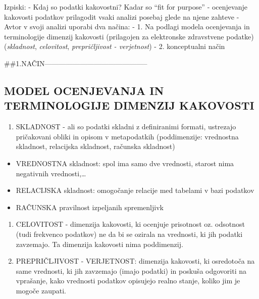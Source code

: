 \documentclass[
]{article}
\providecommand{\tightlist}{%
  \setlength{\itemsep}{0pt}\setlength{\parskip}{0pt}}
\begin{document}
Izpiski: - Kdaj so podatki kakovostni? Kadar so ``fit for purpose'' -
ocenjevanje kakovosti podatkov prilagodit vsaki analizi posebaj glede na
njene zahteve - Avtor v svoji analizi uporabi dva načina: - 1. Na
podlagi modela ocenjevanja in terminologije dimenzij kakovosti
(prilagojen za elektronske zdravstvene podatke) (\emph{skladnost},
\emph{celovitost}, \emph{prepričljivost - verjetnost}) - 2. konceptualni
način

\#\#1.NAČIN--------------------------------------------

\subsection{MODEL OCENJEVANJA IN TERMINOLOGIJE DIMENZIJ
KAKOVOSTI}\label{model-ocenjevanja-in-terminologije-dimenzij-kakovosti}

\begin{enumerate}
\def\labelenumi{\alph{enumi}.}
\tightlist
\item
  SKLADNOST - ali so podatki skladni z definiranimi formati, ustrezajo
  pričakovani obliki in opisom v metapodatkih (poddimenzije: vrednostna
  skladnost, relacijska skladnost, računska skladnost)
\end{enumerate}

\begin{itemize}
\tightlist
\item
  VREDNOSTNA skladnost: spol ima samo dve vrednosti, starost nima
  negativnih vrednosti,\ldots{}
\item
  RELACIJSKA skladnost: omogočanje relacije med tabelami v bazi podatkov
\item
  RAČUNSKA pravilnost izpeljanih spremenljivk
\end{itemize}

\begin{enumerate}
\def\labelenumi{\alph{enumi}.}
\setcounter{enumi}{1}
\item
  CELOVITOST - dimenzija kakovosti, ki ocenjuje prisotnost oz. odsotnost
  (tudi frekvenco podatkov) ne da bi se ozirala na vrednosti, ki jih
  podatki zavzemajo. Ta dimenzija kakovosti nima poddimenzij.
\item
  PREPRIČLJIVOST - VERJETNOST: dimenzija kakovosti, ki osredotoča na
  same vrednosti, ki jih zavzemajo (imajo podatki) in poskuša odgovoriti
  na vprašanje, kako vrednosti podatkov opisujejo realno stanje, koliko
  jim je mogoče zaupati.
\end{enumerate}
\end{document}
